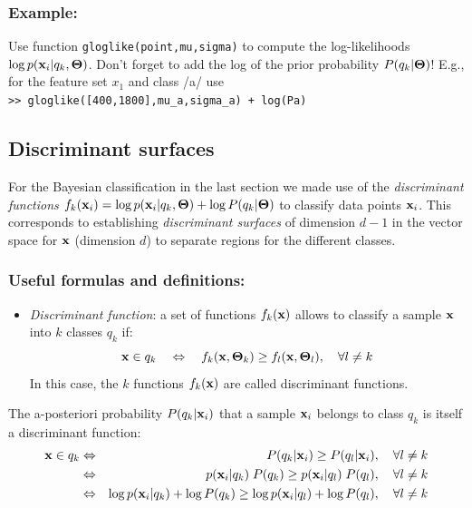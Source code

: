 \documentclass[a4paper]{article}
\newcommand{\com}[1]{{\tt #1}}
\newcommand{\xv}{\ensuremath\mathbf{x}}  %
\newcommand{\Tm}{\ensuremath\boldsymbol{\Theta}}  %
\begin{document}
\subsubsection{Example:}
Use function \com{gloglike(point,mu,sigma)} to compute the
log-likelihoods $\log p(\xv_i|q_k,\Tm)$.  Don't forget to add the log
of the prior probability $P(q_k|\Tm)$!
E.g., for the feature set $x_1$ and class /a/ use\\
\com{>> gloglike([400,1800],mu\_a,sigma\_a) + log(Pa)}



\bigskip
\subsection{Discriminant surfaces}
\label{sec:discr}
For the Bayesian classification in the last section we made use of the
\emph{discriminant functions} $f_k(\xv_i) = \log p(\xv_i|q_k,\Tm) +
\log P(q_k|\Tm)$ to classify data points $\xv_i$.  This corresponds to
establishing \emph{discriminant surfaces} of dimension $d-1$ in the
vector space for $\xv$ (dimension $d$) to separate regions for the
different classes.

\subsubsection*{Useful formulas and definitions:}
\begin{itemize}
\item {\em Discriminant function}: a set of functions $f_k(\xv)$ allows
  to classify a sample $\xv$ into $k$ classes $q_k$ if:
  \[
  \xv \in q_k \quad \Leftrightarrow \quad f_k(\xv,\Tm_k) \geq f_l(\xv,\Tm_l),
  \quad \forall l \neq k
  \]
  In this case, the $k$ functions $f_k(\xv)$ are called discriminant
  functions.
\end{itemize}

The a-posteriori probability $P(q_k|\xv_i)$ that a sample $\xv_i$
belongs to class $q_k$ is itself a discriminant function:
\begin{eqnarray*}
  \xv \in q_k 
  & \Leftrightarrow & P(q_k|\xv_i) \geq P(q_l|\xv_i),\quad \forall l \neq k \\
  & \Leftrightarrow & p(\xv_i|q_k)\; P(q_k) \geq p(\xv_i|q_l)\; P(q_l),\quad
  \forall l \neq k \\
  & \Leftrightarrow & \log p(\xv_i|q_k)+\log P(q_k) \geq \log
  p(\xv_i|q_l)+\log P(q_l),\quad \forall l \neq k
\end{eqnarray*}
\end{document}
